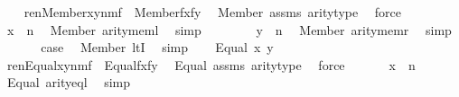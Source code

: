 \begin{isabellebody}
\ \ \isamarkupfalse%
\ {\isachardoublequoteopen}ren{\isacharparenleft}{\kern0pt}Member{\isacharparenleft}{\kern0pt}x{\isacharcomma}{\kern0pt}y{\isacharparenright}{\kern0pt}{\isacharparenright}{\kern0pt}{\isacharbackquote}{\kern0pt}n{\isacharbackquote}{\kern0pt}m{\isacharbackquote}{\kern0pt}f\ {\isacharequal}{\kern0pt}\ Member{\isacharparenleft}{\kern0pt}f{\isacharbackquote}{\kern0pt}x{\isacharcomma}{\kern0pt}f{\isacharbackquote}{\kern0pt}y{\isacharparenright}{\kern0pt}{\isachardoublequoteclose}\ \isamarkupfalse%
\ Member\ assms\ arity{\isacharunderscore}{\kern0pt}type\ \isamarkupfalse%
\ force\isanewline
\ \ \isamarkupfalse%
\isanewline
\ \ \isamarkupfalse%
\ {\isachardoublequoteopen}x\ {\isasymin}\ n{\isachardoublequoteclose}\ \isamarkupfalse%
\ Member\ arity{\isacharunderscore}{\kern0pt}meml\ \isamarkupfalse%
\ simp\isanewline
\ \ \isamarkupfalse%
\ \isanewline
\ \ \isamarkupfalse%
\ {\isachardoublequoteopen}y\ {\isasymin}\ n{\isachardoublequoteclose}\ \isamarkupfalse%
\ Member\ arity{\isacharunderscore}{\kern0pt}memr\ \isamarkupfalse%
\ simp\isanewline
\ \ \isamarkupfalse%
\isanewline
\ \ \isamarkupfalse%
\ {\isacharquery}{\kern0pt}case\ \isamarkupfalse%
\ Member\ ltI\ \isamarkupfalse%
\ simp\isanewline
{}\isamarkupfalse%
\isanewline
\ \ \isamarkupfalse%
\ {\isacharparenleft}{\kern0pt}Equal\ x\ y{\isacharparenright}{\kern0pt}\isanewline
\ \ \isamarkupfalse%
\ {\isachardoublequoteopen}ren{\isacharparenleft}{\kern0pt}Equal{\isacharparenleft}{\kern0pt}x{\isacharcomma}{\kern0pt}y{\isacharparenright}{\kern0pt}{\isacharparenright}{\kern0pt}{\isacharbackquote}{\kern0pt}n{\isacharbackquote}{\kern0pt}m{\isacharbackquote}{\kern0pt}f\ {\isacharequal}{\kern0pt}\ Equal{\isacharparenleft}{\kern0pt}f{\isacharbackquote}{\kern0pt}x{\isacharcomma}{\kern0pt}f{\isacharbackquote}{\kern0pt}y{\isacharparenright}{\kern0pt}{\isachardoublequoteclose}\ \isamarkupfalse%
\ Equal\ assms\ arity{\isacharunderscore}{\kern0pt}type\ \isamarkupfalse%
\ force\isanewline
\ \ \isamarkupfalse%
\isanewline
\ \ \isamarkupfalse%
\ {\isachardoublequoteopen}x\ {\isasymin}\ n{\isachardoublequoteclose}\ \isamarkupfalse%
\ Equal\ arity{\isacharunderscore}{\kern0pt}eql\ \isamarkupfalse%
\ simp\isanewline

\end{isabellebody}
